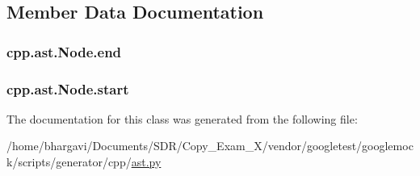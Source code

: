 \subsection{Member Data Documentation}
\subsubsection[{\texorpdfstring{end}{end}}]{\setlength{\rightskip}{0pt plus 5cm}cpp.\+ast.\+Node.\+end}\hypertarget{classcpp_1_1ast_1_1_node_a3c5e5246ccf619df28eca02e29d69647}{}\label{classcpp_1_1ast_1_1_node_a3c5e5246ccf619df28eca02e29d69647}
\subsubsection[{\texorpdfstring{start}{start}}]{\setlength{\rightskip}{0pt plus 5cm}cpp.\+ast.\+Node.\+start}\hypertarget{classcpp_1_1ast_1_1_node_a7b2aa97e6a049bb1a93aea48c48f1f44}{}\label{classcpp_1_1ast_1_1_node_a7b2aa97e6a049bb1a93aea48c48f1f44}


The documentation for this class was generated from the following file\+:\begin{DoxyCompactItemize}
\item 
/home/bhargavi/\+Documents/\+S\+D\+R/\+Copy\+\_\+\+Exam\+\_\+X/vendor/googletest/googlemock/scripts/generator/cpp/\hyperlink{ast_8py}{ast.\+py}\end{DoxyCompactItemize}
